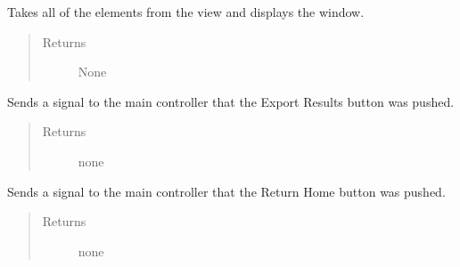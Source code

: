 \documentclass[letterpaper,10pt,english]{sphinxmanual}
\begin{document}
\begin{fulllineitems}
\begin{fulllineitems}
\begin{quote}
\begin{description}
\end{description}\end{quote}

\end{fulllineitems}


\begin{fulllineitems}
\label{\detokenize{index:src.Views.View_ReportScreen.ReportWindow.showWindow}}
Takes all of the elements from the view and displays the window.
\begin{quote}\begin{description}
\item[{Returns}] \leavevmode
None

\end{description}\end{quote}

\end{fulllineitems}


\begin{fulllineitems}
\label{\detokenize{index:src.Views.View_ReportScreen.ReportWindow.signalExportResults}}
Sends a signal to the main controller that the Export Results button was pushed.
\begin{quote}\begin{description}
\item[{Returns}] \leavevmode
none

\end{description}\end{quote}

\end{fulllineitems}


\begin{fulllineitems}
\label{\detokenize{index:src.Views.View_ReportScreen.ReportWindow.signalReturnHome}}
Sends a signal to the main controller that the Return Home button was pushed.
\begin{quote}\begin{description}
\item[{Returns}] \leavevmode
none


\end{description}
\end{quote}
\end{fulllineitems}
\end{fulllineitems}
\end{document}
